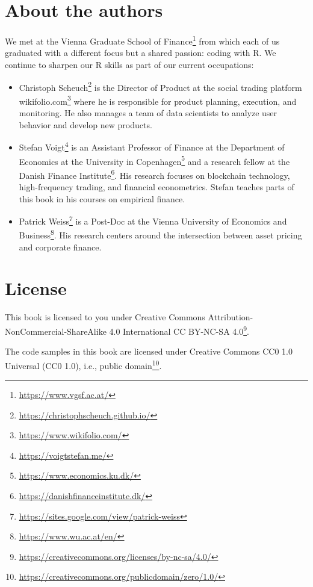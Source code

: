 \documentclass[
]{book}
\providecommand{\tightlist}{%
  \setlength{\itemsep}{0pt}\setlength{\parskip}{0pt}}
\renewcommand{\href}[2]{#2\footnote{\url{#1}}}
\begin{document}
\hypertarget{about-the-authors}{%
\section*{About the authors}\label{about-the-authors}}


We met at the \href{https://www.vgsf.ac.at/}{Vienna Graduate School of Finance} from which each of us graduated with a different focus but a shared passion: coding with R. We continue to sharpen our R skills as part of our current occupations:

\begin{itemize}
\tightlist
\item
  \href{https://christophscheuch.github.io/}{Christoph Scheuch} is the Director of Product at the social trading platform \href{https://www.wikifolio.com/}{wikifolio.com} where he is responsible for product planning, execution, and monitoring. He also manages a team of data scientists to analyze user behavior and develop new products.
\item
  \href{https://voigtstefan.me/}{Stefan Voigt} is an Assistant Professor of Finance at the \href{https://www.economics.ku.dk/}{Department of Economics at the University in Copenhagen} and a research fellow at the \href{https://danishfinanceinstitute.dk/}{Danish Finance Institute}. His research focuses on blockchain technology, high-frequency trading, and financial econometrics. Stefan teaches parts of this book in his courses on empirical finance.
\item
  \href{https://sites.google.com/view/patrick-weiss}{Patrick Weiss} is a Post-Doc at the \href{https://www.wu.ac.at/en/}{Vienna University of Economics and Business}. His research centers around the intersection between asset pricing and corporate finance.
\end{itemize}

\hypertarget{license}{%
\section*{License}\label{license}}


This book is licensed to you under \href{https://creativecommons.org/licenses/by-nc-sa/4.0/}{Creative Commons Attribution-NonCommercial-ShareAlike 4.0 International CC BY-NC-SA 4.0}.

The code samples in this book are licensed under \href{https://creativecommons.org/publicdomain/zero/1.0/}{Creative Commons CC0 1.0 Universal (CC0 1.0), i.e., public domain}.
\end{document}
